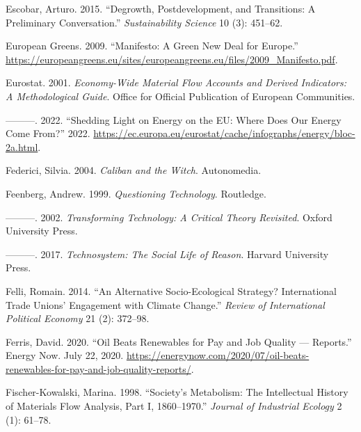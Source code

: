 \documentclass[a4paper, nobind]{templates/ociamthesis}
\newlength{\cslhangindent}
\newenvironment{CSLReferences}[2] %
 {%
  \setlength{\parindent}{0pt}
  \ifodd #1
  \let\oldpar\par
  \def\par{\hangindent=\cslhangindent\oldpar}
  \fi
  \setlength{\parskip}{1mm}
  \setlength{\baselineskip}{6mm}
 }%
 {}
\begin{document}
\begin{CSLReferences}{1}{0}
\leavevmode{}%
Escobar, Arturo. 2015. {``Degrowth, Postdevelopment, and Transitions: A Preliminary Conversation.''} \emph{Sustainability Science} 10 (3): 451--62.

\leavevmode{}%
European Greens. 2009. {``Manifesto: {A Green New Deal} for {Europe}.''} \url{https://europeangreens.eu/sites/europeangreens.eu/files/2009_Manifesto.pdf}.

\leavevmode{}%
Eurostat. 2001. \emph{Economy-Wide Material Flow Accounts and Derived Indicators: {A} Methodological Guide}. {Office for Official Publication of European Communities}.

\leavevmode{}%
---------. 2022. {``Shedding Light on Energy on the {EU}: {Where} Does Our Energy Come From?''} 2022. \url{https://ec.europa.eu/eurostat/cache/infographs/energy/bloc-2a.html}.

\leavevmode{}%
Federici, Silvia. 2004. \emph{Caliban and the {Witch}}. {Autonomedia}.

\leavevmode{}%
Feenberg, Andrew. 1999. \emph{Questioning {Technology}}. {Routledge}.

\leavevmode{}%
---------. 2002. \emph{Transforming {Technology}: {A Critical Theory Revisited}}. {Oxford University Press}.

\leavevmode{}%
---------. 2017. \emph{Technosystem: {The Social Life} of {Reason}}. {Harvard University Press}.

\leavevmode{}%
Felli, Romain. 2014. {``An Alternative Socio-Ecological Strategy? {International} Trade Unions' Engagement with Climate Change.''} \emph{Review of International Political Economy} 21 (2): 372--98.

\leavevmode{}%
Ferris, David. 2020. {``Oil Beats Renewables for Pay and Job Quality --- Reports.''} {Energy Now}. July 22, 2020. \url{https://energynow.com/2020/07/oil-beats-renewables-for-pay-and-job-quality-reports/}.

\leavevmode{}%
Fischer-Kowalski, Marina. 1998. {``Society's Metabolism: The Intellectual History of Materials Flow Analysis, {Part I}, 1860--1970.''} \emph{Journal of Industrial Ecology} 2 (1): 61--78.


\end{CSLReferences}
\end{document}
